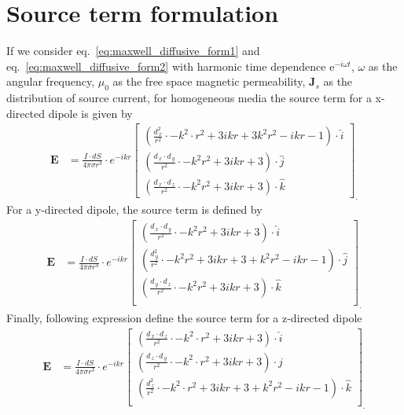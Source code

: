 \documentclass[review]{elsarticle}
\begin{document}
\section{Source term formulation}
\label{Appendix_A}
If we consider eq.~\eqref{eq:maxwell_diffusive_form1} and eq.~\eqref{eq:maxwell_diffusive_form2} with harmonic time dependence e$^{-i \omega t}$, $\omega$ as the angular frequency, $\mu_{0}$ as the free space magnetic permeability, $\mathbf{J}_{s}$ as the distribution of source current, for homogeneous media the source term for a x-directed dipole is given by
\begin{align}
\mathbf{E} &= \frac{I \cdot dS}{4 \pi \sigma r^{3}} \cdot e^{-ikr} \begin{bmatrix}
																(\frac{d_{\,x}^{2}}{r^{2}} \cdot -k^2 \cdot r^{2} + 3ikr + 3 k^{2} r^{2}-ikr-1) \cdot \hat{i} \\
																(\frac{d_{\,x} \cdot d_{\,y}}{r^{2}} \cdot -k^2 r^{2} + 3ikr + 3) \cdot \hat{j} \\
																(\frac{d_{\,x} \cdot d_{\,z}}{r^{2}} \cdot -k^2 r^{2} + 3ikr + 3) \cdot \hat{k}
														   \end{bmatrix}_{.}
\label{eq:x_directed_dipole}
\end{align}
For a y-directed dipole, the source term is defined by
\begin{align}
\mathbf{E} &= \frac{I \cdot dS}{4 \pi \sigma r^{3}} \cdot e^{-ikr} \begin{bmatrix}
																(\frac{d_{\,x} \cdot d_{\,y}}{r^{2}} \cdot -k^2 r^{2} + 3ikr + 3) \cdot \hat{i}\\
																(\frac{d_{\,y}^{2}}{r^{2}} \cdot -k^2 r^{2} + 3ikr + 3 + k^{2} r^{2}-ikr-1) \cdot \hat{j} \\
																(\frac{d_{\,y} \cdot d_{\,z}}{r^{2}} \cdot -k^2 r^{2} + 3ikr + 3) \cdot \hat{k} \\
														   \end{bmatrix}_{.}
\label{eq:y_directed_dipole}
\end{align}
Finally, following expression define the source term for a z-directed dipole
\begin{align}
\mathbf{E} &= \frac{I \cdot dS}{4 \pi \sigma r^{3}} \cdot e^{-ikr} \begin{bmatrix}
																(\frac{d_{\,x} \cdot d_{\,z}}{r^{2}} \cdot -k^2 \cdot r^{2} + 3ikr + 3) \cdot \hat{i}\\
																(\frac{d_{\,z} \cdot d_{\,y}}{r^{2}} \cdot -k^2 \cdot r^{2} + 3ikr + 3) \cdot \hat{j} \\
																(\frac{d_{\,z}^{2}}{r^{2}} \cdot -k^2 \cdot r^{2} + 3ikr + 3 + k^{2} r^{2}-ikr-1) \cdot \hat{k} \\
														   \end{bmatrix}_{.}
\label{eq:z_directed_dipole}
\end{align}
\end{document}
